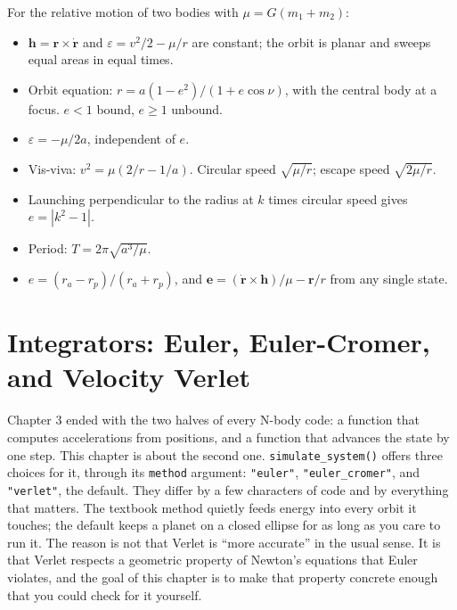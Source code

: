 \documentclass[
  10.5pt,
  letterpaper,
]{scrbook}
\providecommand{\tightlist}{%
  \setlength{\itemsep}{0pt}\setlength{\parskip}{0pt}}
\theoremstyle{plain}
\theoremstyle{remark}
\begin{document}
\begin{tcolorbox}[enhanced jigsaw, arc=.35mm, bottomrule=.15mm, bottomtitle=1mm, breakable, colback=white, colbacktitle=quarto-callout-tip-color!10!white, colframe=quarto-callout-tip-color-frame, coltitle=black, left=2mm, leftrule=.75mm, opacityback=0, opacitybacktitle=0.6, rightrule=.15mm, title={Key results}, titlerule=0mm, toprule=.15mm, toptitle=1mm]

For the relative motion of two bodies with \(\mu = G(m_1 + m_2)\):

\begin{itemize}
\tightlist
\item
  \(\mathbf{h} = \mathbf{r}\times\dot{\mathbf{r}}\) and
  \(\varepsilon = v^2/2 - \mu/r\) are constant; the orbit is planar and
  sweeps equal areas in equal times.
\item
  Orbit equation: \(r = a(1-e^2)/(1+e\cos\nu)\), with the central body
  at a focus. \(e<1\) bound, \(e \ge 1\) unbound.
\item
  \(\varepsilon = -\mu/2a\), independent of \(e\).
\item
  Vis-viva: \(v^2 = \mu(2/r - 1/a)\). Circular speed \(\sqrt{\mu/r}\);
  escape speed \(\sqrt{2\mu/r}\).
\item
  Launching perpendicular to the radius at \(k\) times circular speed
  gives \(e = |k^2-1|\).
\item
  Period: \(T = 2\pi\sqrt{a^3/\mu}\).
\item
  \(e = (r_a - r_p)/(r_a + r_p)\), and
  \(\mathbf{e} = (\dot{\mathbf{r}}\times\mathbf{h})/\mu - \mathbf{r}/r\)
  from any single state.
\end{itemize}

\end{tcolorbox}

\chapter{Integrators: Euler, Euler-Cromer, and Velocity
Verlet}\label{sec-integrators}

Chapter 3 ended with the two halves of every N-body code: a function
that computes accelerations from positions, and a function that advances
the state by one step. This chapter is about the second one.
\texttt{simulate\_system()} offers three choices for it, through its
\texttt{method} argument: \texttt{"euler"}, \texttt{"euler\_cromer"},
and \texttt{"verlet"}, the default. They differ by a few characters of
code and by everything that matters. The textbook method quietly feeds
energy into every orbit it touches; the default keeps a planet on a
closed ellipse for as long as you care to run it. The reason is not that
Verlet is ``more accurate'' in the usual sense. It is that Verlet
respects a geometric property of Newton's equations that Euler violates,
and the goal of this chapter is to make that property concrete enough
that you could check for it yourself.
\end{document}
